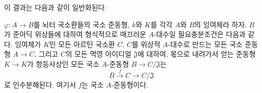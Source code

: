 
이 결과는 다음과 같이 일반화된다.

\begin{proposition}[22.1.4]
\label{0.22.1.4-ko}
$\varphi:A\to B$를 뇌터 국소환들의 국소 준동형, $k$와 $K$를 각각
$A$와 $B$의 잉여체라 하자. $B$가 준아딕 위상들에 대하여 형식적으로
매끄러운 $A$-대수일 필요충분조건은 다음과 같다. 잉여체가 $K$인 모든
아르틴 국소환 $C$, $C$를 위상적 $A$-대수로 만드는 모든 국소 준동형
$A\to C$, 그리고 $C$의 모든 멱영 아이디얼 $\mathfrak J$에 대하여,
몫으로 내려가서 얻는 준동형 $K\to K$가 항등사상인 모든 국소
$A$-준동형 $B\to C/\mathfrak J$는
\[
  B\xrightarrow{f}C\longrightarrow C/\mathfrak J
\]
로 인수분해된다. 여기서 $f$는 국소 $A$-준동형이다.
\end{proposition}

